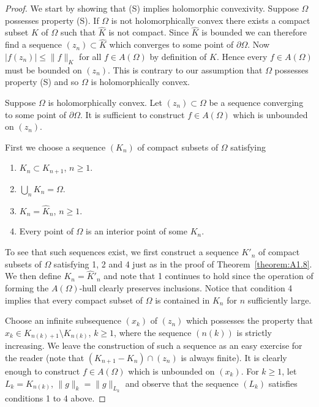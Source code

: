 \begin{proof}
We start by showing that (S) implies holomorphic convexivity. Suppose $\Omega$ possesses property (S). If $\Omega$ is not holomorphically convex there exists a compact subset $K$ of $\Omega$ such that $\widehat K$ is not compact. Since $\widehat K$ is bounded we can therefore find a sequence $(z_n)\subset\widehat K$ which converges to some point of $\partial\Omega$. Now $|f(z_n)|\leq\|f\|_K$ for all $f\in A(\Omega)$ by definition of $\widehat K$. Hence every $f\in A(\Omega)$ must be bounded on $(z_n)$. This is contrary to our assumption that $\Omega$ possesses property (S) and so $\Omega$ is holomorphically convex.

Suppose $\Omega$ is holomorphically convex. Let $(z_n)\subset\Omega$ be a sequence converging to some point of $\partial\Omega$. It is sufficient to construct $f\in A(\Omega)$ which is unbounded on $(z_n)$.

First we choose a sequence $(K_n)$ of compact subsets of $\Omega$ satisfying
\begin{enumerate}
\item $K_n\subset K_{n+1}$, $n\geq1$.
\item $\bigcup_n K_n=\Omega$.
\item $K_n=\widehat K_n$, $n\geq1$.
\item Every point of $\Omega$ is an interior point of some $K_n$.
\end{enumerate}
To see that such sequences exist, we first construct a sequence $K'_n$ of compact subsets of $\Omega$ satisfying 1, 2 and 4 just as in the proof of Theorem~\ref{theorem:A1.8}. We then define $K_n=\widehat K'_n$ and note that 1 continues to hold since the operation of forming the $A(\Omega)$-hull clearly preserves inclusions.
Notice that condition 4 implies that every compact subset of $\Omega$ is contained in $K_n$ for $n$ sufficiently large.

Choose an infinite subsequence $(x_k)$ of $(z_n)$ which possesses the property that $x_k\in K_{n(k)+1}\setminus K_{n(k)}$, $k\geq1$, where the sequence $(n(k))$ is strictly increasing. We leave the construction of such a sequence as an easy exercise for the reader (note that $(K_{n+1}-K_n)\cap(z_n)$ is always finite). It is clearly enough to construct $f\in A(\Omega)$ which is unbounded on $(x_k)$. For $k\geq1$, let $L_k=K_{n(k)}$, $\|g\|_k=\|g\|_{L_k}$ and observe that the sequence $(L_k)$ satisfies conditions 1 to 4 above.


\end{proof}
